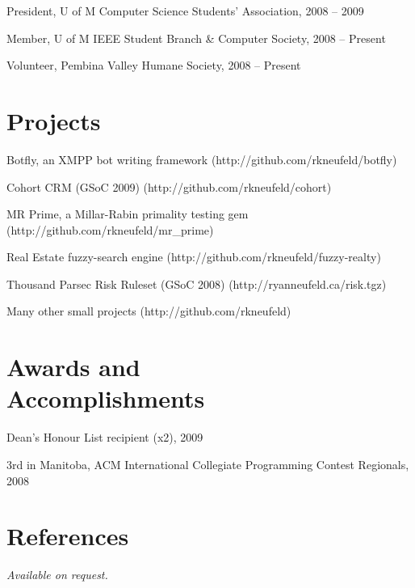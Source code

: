 \documentclass[margin,line,letterpaper]{resume}
\begin{document}
\begin{resume}
  \begin{list2}
    \item President, U of M Computer Science Students' Association, 2008 -- 2009
    \item Member, U of M IEEE Student Branch \& Computer Society, 2008 -- Present
    \item Volunteer, Pembina Valley Humane Society, 2008 -- Present
  \end{list2}

  \section{\mysidestyle Projects}

  \begin{list2}
    \item Botfly, an XMPP bot writing framework (http://github.com/rkneufeld/botfly)
    \item Cohort CRM (GSoC 2009) (http://github.com/rkneufeld/cohort)
    \item MR Prime, a Millar-Rabin primality testing gem (http://github.com/rkneufeld/mr\_prime)
    \item Real Estate fuzzy-search engine (http://github.com/rkneufeld/fuzzy-realty)
    \item Thousand Parsec Risk Ruleset (GSoC 2008) (http://ryanneufeld.ca/risk.tgz)
    \item Many other small projects (http://github.com/rkneufeld)
  \end{list2}

  \section{\mysidestyle Awards and\\Accomplishments}

  \begin{list2}
    \item Dean's Honour List recipient (x2), 2009
    \item 3rd in Manitoba, ACM International Collegiate Programming Contest Regionals, 2008
  \end{list2}

  \section{\mysidestyle References}

  {\sl Available on request.}

\end{resume}
\end{document}
